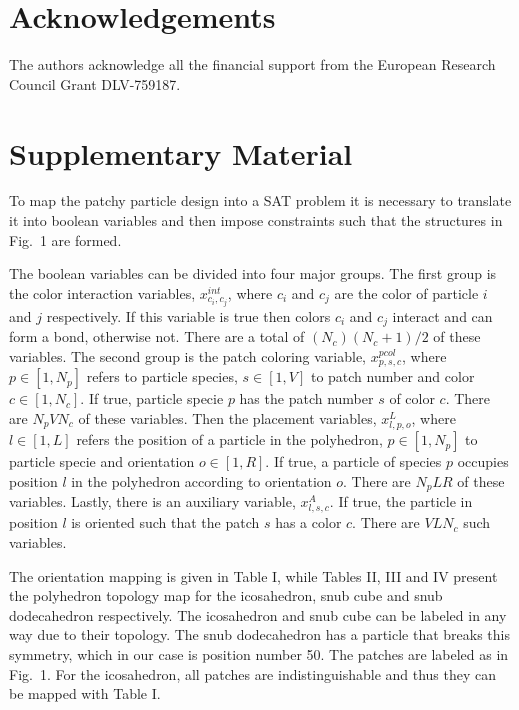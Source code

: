 \documentclass[a4paper, amsfonts, amssymb, amsmath, reprint, showkeys, nofootinbib, twoside]{revtex4-1}
\begin{document}
\section{Acknowledgements}

The authors acknowledge all the financial support from the European Research Council Grant DLV-759187.



\section{Supplementary Material}

To map the patchy particle design into a SAT problem it is necessary to translate it into boolean variables and then impose constraints such that the structures in Fig.~1 are formed.

The boolean variables can be divided into four major groups. The first group is the color interaction variables, $x_{c_i,c_j}^{int}$, where $c_i$ and $c_j$ are the color of particle $i$ and $j$ respectively. If this variable is true then colors $c_i$ and $c_j$ interact and can form a bond, otherwise not. There are a total of $(N_c)(N_c+1)/2$ of these variables. The second group is the patch coloring variable, $x_{p,s,c}^{pcol}$, where $p\in [1, N_p]$ refers to particle species, $s\in [1, V]$ to patch number and color $c\in [1, N_c]$. If true, particle specie $p$ has the patch number $s$ of color $c$. There are $N_pVN_c$ of these variables. Then the placement variables, $x_{l,p,o}^{L}$, where $l\in [1, L]$ refers the position of a particle in the polyhedron, $p\in [1, N_p]$ to particle specie and orientation $o\in [1, R]$. If true, a particle of species $p$ occupies position $l$ in the polyhedron according to orientation $o$. There are $N_pLR$ of these variables. Lastly, there is an auxiliary variable, $x_{l,s,c}^{A}$. If true, the particle in position $l$ is oriented such that the patch $s$ has a color $c$. There are $VLN_c$ such variables.

The orientation mapping is given in Table I, while Tables II, III and IV present the polyhedron topology map for the icosahedron, snub cube and snub dodecahedron respectively. The icosahedron and snub cube can be labeled in any way due to their topology. The snub dodecahedron has a particle that breaks this symmetry, which in our case is position number 50. The patches are labeled as in Fig.~1. For the icosahedron, all patches are indistinguishable and thus they can be mapped with Table I.
\end{document}
